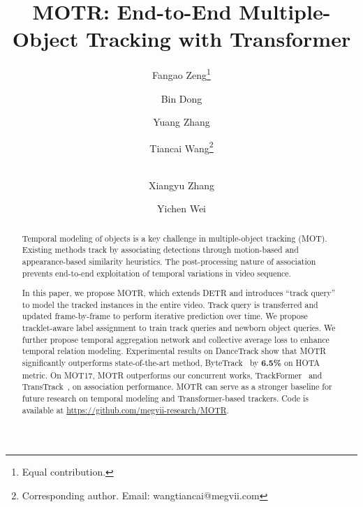 \documentclass[runningheads]{llncs}
\begin{document}
\pagestyle{headings}
\mainmatter
\def\ECCVSubNumber{4669}  

\title{MOTR: End-to-End Multiple-Object Tracking with Transformer} 

\begin{comment}
\titlerunning{ECCV-22 submission ID \ECCVSubNumber}
\authorrunning{ECCV-22 submission ID \ECCVSubNumber}
\author{Anonymous ECCV submission}
\institute{Paper ID \ECCVSubNumber}
\end{comment}


\author{Fangao Zeng\thanks{Equal contribution.} \and
  Bin Dong\textsuperscript{} \and
  Yuang Zhang\textsuperscript{} \and
  Tiancai Wang\thanks{Corresponding author. Email:  wangtiancai@megvii.com} \and \\
  Xiangyu Zhang \and
  Yichen Wei}
\maketitle

\begin{abstract}
  Temporal modeling of objects is a key challenge in multiple-object tracking (MOT).
  Existing methods track by associating detections through motion-based and appearance-based similarity heuristics.
  The post-processing nature of association prevents end-to-end exploitation of temporal variations in video sequence.

  In this paper, we propose MOTR, which extends DETR \cite{carion2020detr} and introduces ``track query'' to model the tracked instances in the entire video. Track query is transferred and updated frame-by-frame to perform iterative prediction over time. We propose tracklet-aware label assignment to train track queries and newborn object queries.
  We further propose temporal aggregation network and collective average loss to enhance temporal relation modeling.
Experimental results on DanceTrack show that MOTR significantly outperforms state-of-the-art method, ByteTrack~\cite{zhang2021bytetrack} by \textbf{6.5\%} on HOTA metric.
  On MOT17, MOTR outperforms our concurrent works, TrackFormer~\cite{Meinhardt2021trackformer} and TransTrack~\cite{transtrack}, on association performance.
  MOTR can serve as a stronger baseline for future research on temporal modeling and Transformer-based trackers.
  Code is available at \url{https://github.com/megvii-research/MOTR}.

\end{abstract}
\end{document}
